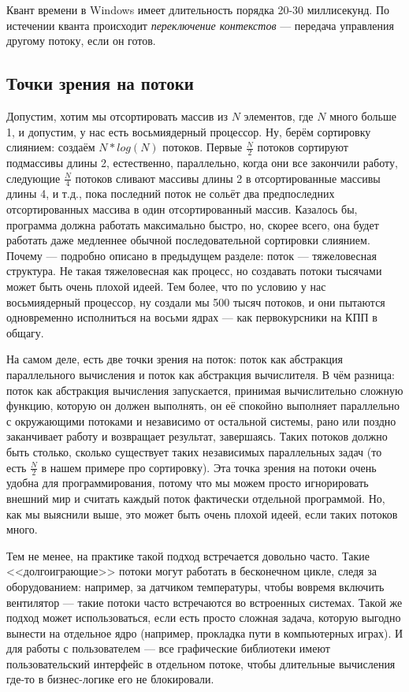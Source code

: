 \documentclass[a5paper]{article}
\begin{document}
Квант времени в Windows имеет длительность порядка 20-30 миллисекунд. По истечении кванта происходит \textit{переключение контекстов} --- передача управления другому потоку, если он готов.

\subsection{Точки зрения на потоки}

Допустим, хотим мы отсортировать массив из $N$ элементов, где $N$ много больше 1, и допустим, у нас есть восьмиядерный процессор. Ну, берём сортировку слиянием: создаём $N * log(N)$ потоков. Первые $\frac{N}{2}$ потоков сортируют подмассивы длины 2, естественно, параллельно, когда они все закончили работу, следующие $\frac{N}{4}$ потоков сливают массивы длины 2 в отсортированные массивы длины 4, и т.д., пока последний поток не сольёт два предпоследних отсортированных массива в один отсортированный массив. Казалось бы, программа должна работать максимально быстро, но, скорее всего, она будет работать даже медленнее обычной последовательной сортировки слиянием. Почему --- подробно описано в предыдущем разделе: поток --- тяжеловесная структура. Не такая тяжеловесная как процесс, но создавать потоки тысячами может быть очень плохой идеей. Тем более, что по условию у нас восьмиядерный процессор, ну создали мы 500 тысяч потоков, и они пытаются одновременно исполниться на восьми ядрах --- как первокурсники на КПП в общагу.

На самом деле, есть две точки зрения на поток: поток как абстракция параллельного вычисления и поток как абстракция вычислителя. В чём разница: поток как абстракция вычисления запускается, принимая вычислительно сложную функцию, которую он должен выполнять, он её спокойно выполняет параллельно с окружающими потоками и независимо от остальной системы, рано или поздно заканчивает работу и возвращает результат, завершаясь. Таких потоков должно быть столько, сколько существует таких независимых параллельных задач (то есть $\frac{N}{2}$ в нашем примере про сортировку). Эта точка зрения на потоки очень удобна для программирования, потому что мы можем просто игнорировать внешний мир и считать каждый поток фактически отдельной программой. Но, как мы выяснили выше, это может быть очень плохой идеей, если таких потоков много. 

Тем не менее, на практике такой подход встречается довольно часто. Такие <<долгоиграющие>> потоки могут работать в бесконечном цикле, следя за оборудованием: например, за датчиком температуры, чтобы вовремя включить вентилятор --- такие потоки часто встречаются во встроенных системах. Такой же подход может использоваться, если есть просто сложная задача, которую выгодно вынести на отдельное ядро (например, прокладка пути в компьютерных играх). И для работы с пользователем --- все графические библиотеки имеют пользовательский интерфейс в отдельном потоке, чтобы длительные вычисления где-то в бизнес-логике его не блокировали.
\end{document}

